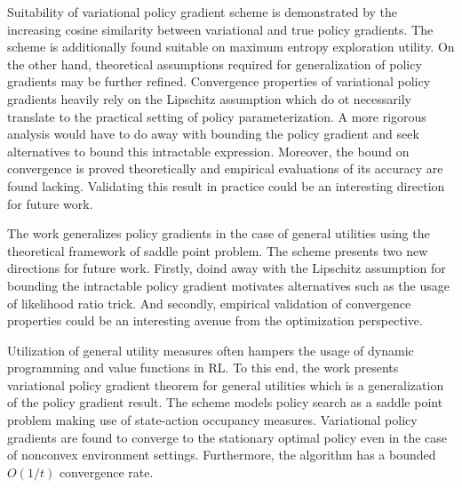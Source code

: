 \documentclass[11pt,letterpaper]{article}
\begin{document}
Suitability of variational policy gradient scheme is demonstrated by the increasing cosine similarity between variational and true policy gradients. The scheme is additionally found suitable on maximum entropy exploration utility. On the other hand, theoretical assumptions required for generalization of policy gradients may be further refined. Convergence properties of variational policy gradients heavily rely on the Lipschitz assumption which do ot necessarily translate to the practical setting of policy parameterization. A more rigorous analysis would have to do away with bounding the policy gradient and seek alternatives to bound this intractable expression. Moreover, the bound on convergence is proved theoretically and empirical evaluations of its accuracy are found lacking. Validating this result in practice could be an interesting direction for future work. 

The work generalizes policy gradients in the case of general utilities using the theoretical framework of saddle point problem. The scheme presents two new directions for future work. Firstly, doind away with the Lipschitz assumption for bounding the intractable policy gradient motivates alternatives such as the usage of likelihood ratio trick. And secondly, empirical validation of convergence properties could be an interesting avenue from the optimization perspective. 

Utilization of general utility measures often hampers the usage of dynamic programming and value functions in RL. To this end, the work presents variational policy gradient theorem for general utilities which is a generalization of the policy gradient result. The scheme models policy search as a saddle point problem making use of state-action occupancy measures. Variational policy gradients are found to converge to the stationary optimal policy even in the case of nonconvex environment settings. Furthermore, the algorithm has a bounded $O(1/t)$ convergence rate. 
\end{document}
